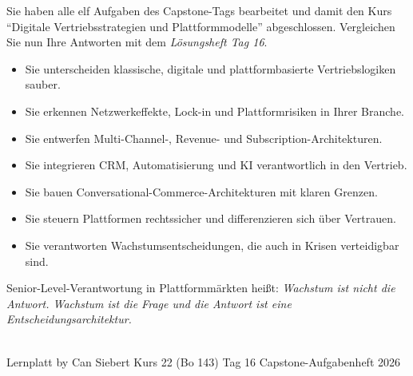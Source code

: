 \documentclass[11pt,a4paper,oneside]{article}
\begin{document}
\noindent Sie haben alle elf Aufgaben des Capstone-Tags bearbeitet \textendash{} und damit den Kurs ``Digitale Vertriebsstrategien und Plattformmodelle'' abgeschlossen. Vergleichen Sie nun Ihre Antworten mit dem \emph{Lösungsheft Tag 16}.

\medskip
\begin{infobox}
\begin{itemize}
  \item Sie unterscheiden klassische, digitale und plattformbasierte Vertriebslogiken sauber.
  \item Sie erkennen Netzwerkeffekte, Lock-in und Plattformrisiken in Ihrer Branche.
  \item Sie entwerfen Multi-Channel-, Revenue- und Subscription-Architekturen.
  \item Sie integrieren CRM, Automatisierung und KI verantwortlich in den Vertrieb.
  \item Sie bauen Conversational-Commerce-Architekturen mit klaren Grenzen.
  \item Sie steuern Plattformen rechtssicher und differenzieren sich über Vertrauen.
  \item Sie verantworten Wachstumsentscheidungen, die auch in Krisen verteidigbar sind.
\end{itemize}
\end{infobox}

\medskip
\begin{infobox}
Senior-Level-Verantwortung in Plattformmärkten heißt: \emph{Wachstum ist nicht die Antwort. Wachstum ist die Frage \textendash{} und die Antwort ist eine Entscheidungsarchitektur.}
\end{infobox}

\vspace{1cm}
\noindent{\color{lpAccent}\rule{\linewidth}{0.6pt}}\\[4pt]
{\footnotesize\sffamily\color{lpGray}Lernplatt \textperiodcentered{} by Can Siebert \textperiodcentered{} Kurs 22 (Bo 143) \textperiodcentered{} Tag 16 \textperiodcentered{} Capstone-Aufgabenheft \textperiodcentered{} \textcopyright{} 2026}
\end{document}
